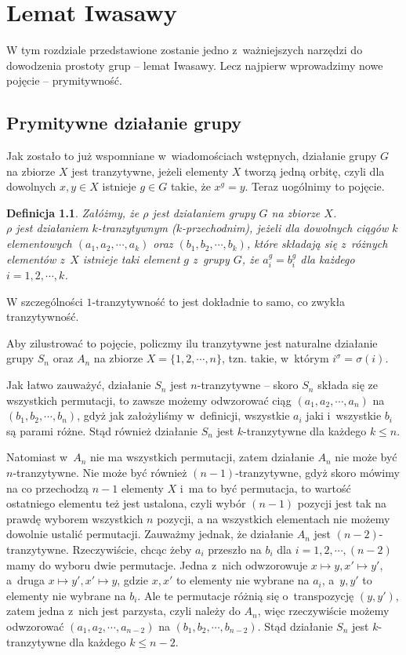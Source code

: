 \documentclass[licencjacka]{pracamgr}
\newtheorem{deff}{Definicja}[section]
\begin{document}
\chapter{Lemat Iwasawy}
W tym rozdziale przedstawione zostanie jedno z~ważniejszych narzędzi do dowodzenia prostoty grup -- lemat Iwasawy.
Lecz najpierw wprowadzimy nowe pojęcie --  prymitywność.

\section{Prymitywne działanie grupy}
Jak zostało to już wspomniane w~wiadomościach wstępnych, działanie grupy $G$ na zbiorze $X$ jest tranzytywne, 
jeżeli elementy $X$ tworzą jedną orbitę, czyli dla dowolnych $x, y \in X$ istnieje $g \in G$ takie, że $x^g = y$.
Teraz uogólnimy to pojęcie.

\begin{deff}
	Załóżmy, że $\rho$ jest działaniem grupy $G$ na zbiorze $X$. \\
	\emph{$\rho$ jest działaniem $k$-tranzytywnym ($k$-przechodnim)}, 
	jeżeli dla dowolnych ciągów $k$ elementowych $(a_1, a_2, \cdots, a_k)$ oraz $(b_1, b_2, \cdots, b_k)$, 
	które składają się z~różnych elementów z~$X$ istnieje taki element $g$ z~grupy $G$, że
	$a_i^g = b_i^g$ dla każdego $i = 1, 2, \cdots, k$.
\end{deff}
W szczególności $1$-tranzytywność to jest dokładnie to samo, co zwykła tranzytywność.

Aby zilustrować to pojęcie, policzmy ilu tranzytywne jest naturalne działanie grupy $S_n$ oraz $A_n$ na zbiorze $X = \{1, 2, \cdots, n\}$,
tzn. takie, w~którym $i^\sigma = \sigma(i)$.

Jak łatwo zauważyć, działanie $S_n$ jest $n$-tranzytywne -- skoro $S_n$ składa się ze wszystkich permutacji, 
to zawsze możemy odwzorować ciąg $(a_1, a_2, \cdots, a_n)$ na $(b_1, b_2, \cdots, b_n)$, gdyż jak założyliśmy w~definicji, 
wszystkie $a_i$ jaki i~wszystkie $b_i$ są parami różne.
Stąd również działanie $S_n$ jest $k$-tranzytywne dla każdego $k \le n$.

Natomiast w~$A_n$ nie ma wszystkich permutacji, zatem działanie $A_n$ nie może być $n$-tranzytywne.
Nie może być również $(n-1)$-tranzytywne, gdyż skoro mówimy na co przechodzą $n-1$ elementy $X$ i~ma to być permutacja,
to wartość ostatniego elementu też jest ustalona, czyli wybór $(n-1)$ pozycji jest tak na prawdę wyborem wszystkich $n$ pozycji, 
a na wszystkich elementach nie możemy dowolnie ustalić permutacji.
Zauważmy jednak, że działanie $A_n$ jest $(n-2)$-tranzytywne. 
Rzeczywiście, chcąc żeby $a_i$ przeszło na $b_i$ dla $i = 1, 2, \cdots, (n-2)$ mamy do wyboru dwie permutacje.
Jedna z~nich odwzorowuje $x \mapsto y, x' \mapsto y'$, a~druga $x \mapsto y', x' \mapsto y$, 
gdzie $x, x'$ to elementy nie wybrane na $a_i$, a~$y, y'$ to elementy nie wybrane na $b_i$. 
Ale te permutacje różnią się o~transpozycję $(y, y')$, zatem jedna z~nich jest parzysta, czyli należy do $A_n$,
więc rzeczywiście możemy odwzorować $(a_1, a_2, \cdots, a_{n-2})$ na $(b_1, b_2, \cdots, b_{n-2})$.
Stąd działanie $S_n$ jest $k$-tranzytywne dla każdego $k \le n-2$.
\end{document}
